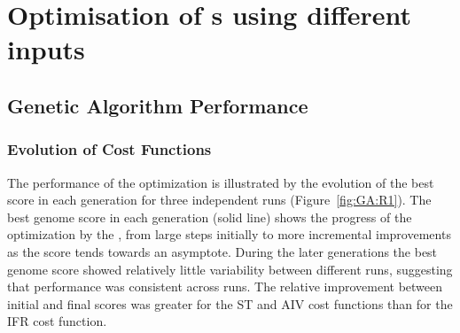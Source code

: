 \section{Optimisation of {\BNN}s using different  inputs}\label{sec:GA:ResultDiffAN}






\subsection{Genetic Algorithm Performance}


\subsubsection{Evolution of Cost Functions}

The performance of the {\GA} optimization is illustrated by the evolution of the
best score in each generation for three independent {\GA} runs
(Figure~\ref{fig:GA:R1}). The best genome score in each generation (solid line)
shows the progress of the optimization by the {\GA}, from large steps initially to
more incremental improvements as the score tends towards an asymptote.  During
the later generations the best genome score showed relatively little variability
between different {\GA} runs, suggesting that {\GA} performance was consistent across
runs. The relative improvement between initial and final scores was greater for
the ST and AIV cost functions than for the IFR cost function.

